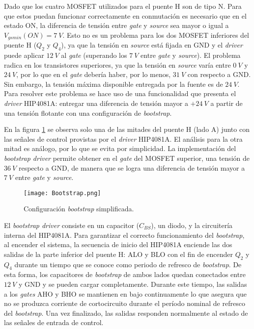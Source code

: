 Dado que los cuatro MOSFET utilizados para el puente H son de tipo N. Para que estos puedan funcionar correctamente en conmutación es necesario que en el estado ON, la diferencia de tensión entre \textsl{gate} y \textsl{source} sea mayor o igual a $V_{gs min}(ON) = 7\:V$. Esto no es un problema para los dos MOSFET inferiores del puente H ($Q_2$ y $Q_4$), ya que la tensión en \textsl{source} está fijada en GND y el \textsl{driver} puede aplicar $12\:V$ al \textsl{gate} (superando los $7\:V$ entre \textsl{gate} y \textsl{source}). El problema radica en los transistores superiores, ya que la tensión en \textsl{source} varía entre $0\:V$ y $24\:V$, por lo que en el \textsl{gate} debería haber, por lo menos, $31\:V$ con respecto a GND. Sin embargo, la tensión máxima disponible entregada por la fuente es de $24\:V$. Para resolver este problema se hace uso de una funcionalidad que presenta el \textsl{driver} HIP4081A: entregar una diferencia de tensión mayor a $+24\:V$ a partir de una tensión flotante con una configuración de \textsl{bootstrap}.

En la figura \ref{fig:img_bootstrap} se observa solo una de las mitades del puente H (lado A) junto con las señales de control provistas por el \textsl{driver} HIP4081A.  El análisis para la otra mitad es análogo, por lo que se evita por simplicidad. La implementación del \textsl{bootstrap driver} permite obtener en el \textsl{gate} del MOSFET superior, una tensión de $36\:V$ respecto a GND, de manera que se logra una diferencia de tensión mayor a $7\:V$ entre \textsl{gate} y \textsl{source}. 


\begin{figure}[H]
	\centering
	\texttt{[image: Bootstrap.png]}
	\caption{Configuración \textsl{bootstrap} simplificada.}
	\label{fig:img_bootstrap}
\end{figure}

El \textsl{bootstrap driver} consiste en un capacitor ($C_{BS}$), un diodo, y la circuitería interna del HIP4081A. Para garantizar el correcto funcionamiento del \textsl{bootstrap}, al encender el sistema, la secuencia de inicio del HIP4081A enciende las dos salidas de la parte inferior del puente H: ALO y BLO con el fin de encender $Q_2$ y $Q_4$ durante un tiempo que se conoce como periodo de refresco de \textsl{bootstrap}. De esta forma, los capacitores de \textsl{bootstrap} de ambos lados quedan conectados entre $12\:V$ y GND y se pueden cargar completamente. Durante este tiempo, las salidas a los \textsl{gates} AHO y BHO se mantienen en bajo continuamente lo que asegura que no se produzca corriente de cortocircuito durante el período nominal de refresco del \textsl{bootstrap}. Una vez finalizado, las salidas responden normalmente al estado de las señales de entrada de control.

